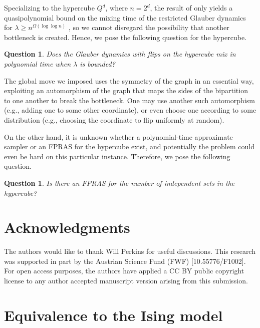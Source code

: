 \documentclass[reqno,a4paper,11pt]{amsart}
\newtheorem{question}[theorem]{Question}
\newcommand{\lam}{\lambda}
\newcommand{\Om}{\Omega}
\begin{document}
Specializing to the hypercube $Q^d$, where $n=2^d$, the result of \cite{CheGaGoPeSteVi21} only yields a quasipolynomial bound on the mixing time of the restricted Glauber dynamics for $\lam\geq n^{\Om(\log\log n)}$ , so we cannot disregard the possibility that another bottleneck is created. Hence, we pose the following question for the hypercube.
\begin{question}\label{ques:global_glauber}
    Does the Glauber dynamics with flips on the hypercube mix in polynomial time when $\lam$ is bounded?
\end{question}
The global move we imposed uses the symmetry of the graph in an essential way, exploiting an automorphism of the graph that maps the sides of the bipartition to one another to break the bottleneck. One may use another such automorphism (e.g., adding one to some other coordinate), or even choose one according to some distribution (e.g., choosing the coordinate to flip uniformly at random). 

On the other hand, it is unknown whether a polynomial-time approximate sampler or an FPRAS for the hypercube exist, and potentially the problem could even be hard on this particular instance. Therefore, we pose the following question.
\begin{question}\label{ques:hypercube_bis}
    Is there an FPRAS for the number of independent sets in the hypercube?
\end{question}

\section*{Acknowledgments}
The authors would like to thank Will Perkins for useful discussions. This research was supported in part by the Austrian Science Fund (FWF) [10.55776/F1002].
For open access purposes, the authors have applied a CC BY public copyright license to any author accepted manuscript version arising from this submission.

\printbibliography


\newpage
\appendix

\section{Equivalence to the Ising model}\label{sec:ising}
\end{document}
